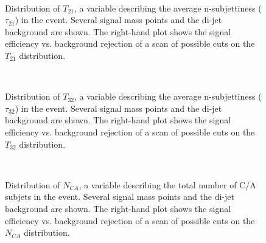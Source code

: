


\begin{figure}
\centering
{}\\
\caption{Distribution of $T_{21}$, a variable describing the average n-subjettiness ($\tau_{21}$) in the event. Several signal mass points and the \herwigpp di-jet background are shown. The right-hand plot shows the signal efficiency vs. background rejection of a scan of possible cuts on the $T_{21}$ distribution.}
\label{fig:search:search:optimization:T21}
\end{figure}



\begin{figure}
\centering
{}\\
\caption{Distribution of $T_{32}$, a variable describing the average n-subjettiness ($\tau_{32}$) in the event. Several signal mass points and the \herwigpp di-jet background are shown. The right-hand plot shows the signal efficiency vs. background rejection of a scan of possible cuts on the $T_{32}$ distribution.}
\label{fig:search:search:optimization:T32}
\end{figure}





\begin{figure}
\centering
{}\\
\caption{Distribution of $N_{CA}$, a variable describing the total number of C/A subjets in the event. Several signal mass points and the \herwigpp di-jet background are shown. The right-hand plot shows the signal efficiency vs. background rejection of a scan of possible cuts on the $N_{CA}$ distribution.}
\label{fig:search:search:optimization:NCA}
\end{figure}

